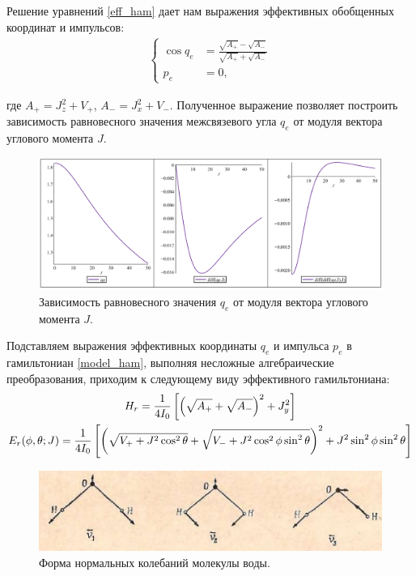 Решение уравнений \eqref{eff_ham} дает нам выражения эффективных обобщенных координат и импульсов:
\begin{gather}
\left\{
\begin{aligned}
\cos q_e &= \frac{\sqrt{A_{+}} - \sqrt{A_{-}}}{\sqrt{A_{+}} + \sqrt{A_{-}}} \\
p_e &= 0,
\end{aligned}
\right.
\end{gather}

\vlevo где $A_{+} = J_z^2 + V_{+}$, $A_{-} = J_x^2 + V_{-}$. 
Полученное выражение позволяет построить зависимость равновесного значения межсвязевого угла $q_e$ от модуля вектора углового момента $J$. 
\vverh
\begin{figure}[!ht]
  \centering
	\includegraphics[width=\textwidth]{../pictures/qe_rigid.png}
	\caption{Зависимость равновесного значения $q_e$ от модуля вектора углового момента $J$.}
	\label{fig:qe}
\end{figure}

Подставляем выражения эффективных координаты $q_e$ и импульса $p_e$ в гамильтониан \eqref{model_ham}, выполняя несложные алгебраические преобразования, приходим к следующему виду эффективного гамильтониана:
\vverh
\begin{gather}
H_r = \frac{1}{4I_0} \left[ \left( \sqrt{A_{+}} + \sqrt{A_{-}} \right)^2 + J_y^2 \right] \notag \\
E_r (\phi, \theta; J) = \frac{1}{4I_0} \left[ \left( \sqrt{V_{+} + J^2 \cos^2 \theta} + \sqrt{V_{-} + J^2 \cos^2 \phi \sin^2 \theta} \right)^2 + J^2 \sin^2 \phi \sin^2 \theta \right] \notag
\end{gather}

\begin{figure}[H]
  \centering
	\includegraphics[scale=0.75]{../pictures/NormalModes.png}
	\caption{Форма нормальных колебаний молекулы воды.}
\end{figure}

